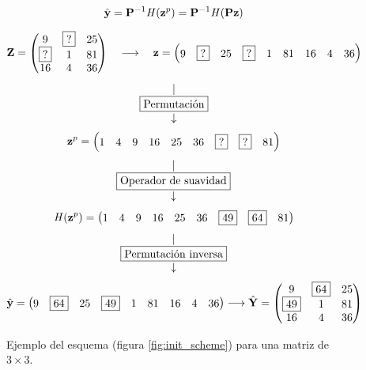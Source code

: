 \begin{equation}
	\hat{\mathbf{y}} = \mathbf{P}^{-1}\mathit{H}(\mathbf{z}^p) = \mathbf{P}^{-1}\mathit{H}(\mathbf{P}\mathbf{z})
	\label{eq:yhat}
\end{equation}

\begin{figure}
	\[
	\mathbf{Z} = \left(
		\begin{matrix}
			9 & \boxed{?} & 25\\
			\boxed{?} &  1 & 81\\
			16 &  4 & 36\\
		\end{matrix}
	\right)
	\quad\longrightarrow\quad
	\mathbf{z} = \left(
		\begin{matrix}
			9 & \boxed{?} & 25 & \boxed{?} &  1 & 81 & 16 &  4 & 36\\
		\end{matrix}
	\right)
	\]
	\[\begin{array}{c}\arrowvert\\ \boxed{\mbox{Permutaci\'on}}\\ \downarrow\\\end{array}\]
	\[
	\mathbf{z}^p = \left(
		\begin{matrix}
			1 & 4 & 9 & 16 & 25 & 36 & \boxed{?} & \boxed{?} & 81 \\
		\end{matrix}
	\right)
	\]
	\[\begin{array}{c}\arrowvert\\ \boxed{\mbox{Operador de suavidad}}\\ \downarrow\\\end{array}\]
	\[
	\mathit{H}(\mathbf{z}^p) = \left(
		\begin{matrix}
			1 & 4 & 9 & 16 & 25 & 36 & \boxed{49} & \boxed{64} & 81 \\
		\end{matrix}
	\right)
	\]
	\[\begin{array}{c}\arrowvert\\ \boxed{\mbox{Permutaci\'on inversa}}\\ \downarrow\\\end{array}\]
	\[
	\hat{\mathbf{y}} = \left(
		\begin{matrix}
			9 & \boxed{64} & 25 & \boxed{49} &  1 & 81 & 16 &  4 & 36\\
		\end{matrix}
	\right) \longrightarrow 
	\hat{\mathbf{Y}} = \left(
		\begin{matrix}
			9 & \boxed{64} & 25\\
			\boxed{49} &  1 & 81\\
			16 &  4 & 36\\
		\end{matrix}
	\right)
	\]
	\caption{Ejemplo del esquema (figura \ref{fig:init_scheme}) para una matriz de $3 \times 3$.}
	\label{ex:init_scheme}
\end{figure}

